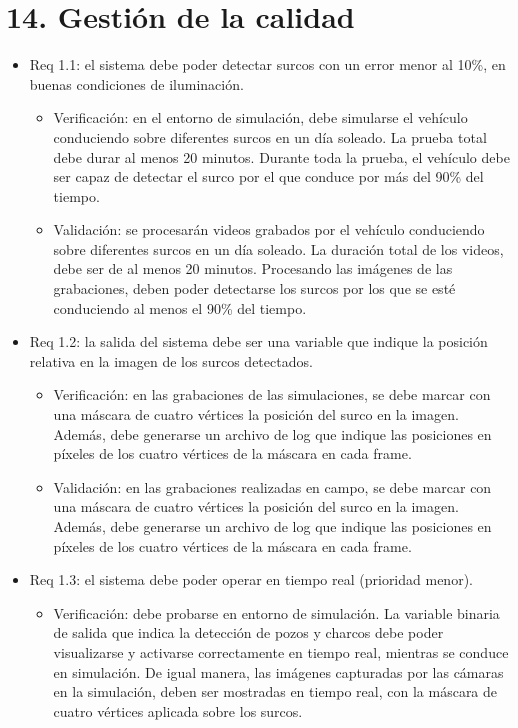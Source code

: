 \documentclass[
11pt, %
]{charter}
\begin{document}
\section{14. Gestión de la calidad}
\label{sec:calidad}

\begin{itemize}
	
	\item Req 1.1: el sistema debe poder detectar surcos con un error menor al 10\%, en buenas condiciones de iluminación.
	\begin{itemize}
		\item Verificación: en el entorno de simulación, debe simularse el vehículo conduciendo sobre diferentes surcos en un día soleado. La prueba total debe durar al menos 20 minutos. Durante toda la prueba, el vehículo debe ser capaz de detectar el surco por el que conduce por más del 90\% del tiempo.
		\item Validación: se procesarán videos grabados por el vehículo conduciendo sobre diferentes surcos en un día soleado. La duración total de los videos, debe ser de al menos 20 minutos. Procesando las imágenes de las grabaciones, deben poder detectarse los surcos por los que se esté conduciendo al menos el 90\% del tiempo.
	\end{itemize}
	\item Req 1.2: la salida del sistema debe ser una variable que indique la posición relativa en la imagen de los surcos detectados.
	\begin{itemize}
		\item Verificación: en las grabaciones de las simulaciones, se debe marcar con una máscara de cuatro vértices la posición del surco en la imagen. Además, debe generarse un archivo de log que indique las posiciones en píxeles de los cuatro vértices de la máscara en cada frame.
		\item Validación: en las grabaciones realizadas en campo, se debe marcar con una máscara de cuatro vértices la posición del surco en la imagen. Además, debe generarse un archivo de log que indique las posiciones en píxeles de los cuatro vértices de la máscara en cada frame.
	\end{itemize}
	\item Req 1.3: el sistema debe poder operar en tiempo real (prioridad menor).
	\begin{itemize}
		\item Verificación: debe probarse en entorno de simulación. La variable binaria de salida que indica la detección de pozos y charcos debe poder visualizarse y activarse correctamente en tiempo real, mientras se conduce en simulación. De igual manera, las imágenes capturadas por las cámaras en la simulación, deben ser mostradas en tiempo real, con la máscara de cuatro vértices aplicada sobre los surcos.

\end{itemize}
\end{itemize}
\end{document}
